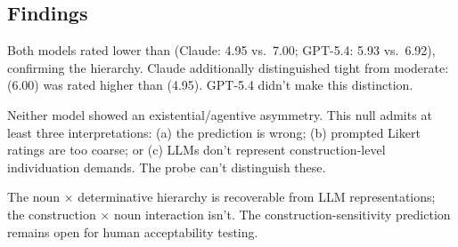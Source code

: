 \documentclass[12pt,a4paper]{article}
\begin{document}


\subsection*{Findings}



Both models rated  lower than  (Claude: 4.95 vs.\ 7.00; GPT-5.4: 5.93 vs.\ 6.92), confirming the hierarchy. Claude additionally distinguished tight from moderate:  (6.00) was rated higher than  (4.95). GPT-5.4 didn't make this distinction.

Neither model showed an existential/agentive asymmetry. This null admits at least three interpretations: (a) the prediction is wrong; (b) prompted Likert ratings are too coarse; or (c) LLMs don't represent construction-level individuation demands. The probe can't distinguish these.

The noun $\times$ determinative hierarchy is recoverable from LLM representations; the construction $\times$ noun interaction isn't. The construction-sensitivity prediction remains open for human acceptability testing.
\end{document}
